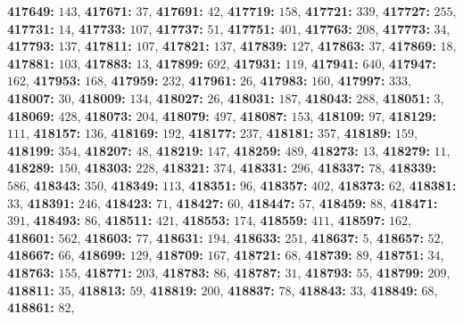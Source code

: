 \textsf{\bfseries 417649:} $143$, \textsf{\bfseries 417671:} $37$, \textsf{\bfseries 417691:} $42$, \textsf{\bfseries 417719:} $158$, \textsf{\bfseries 417721:} $339$, \textsf{\bfseries 417727:} $255$, \textsf{\bfseries 417731:} $14$, \textsf{\bfseries 417733:} $107$, \textsf{\bfseries 417737:} $51$, \textsf{\bfseries 417751:} $401$, \textsf{\bfseries 417763:} $208$, \textsf{\bfseries 417773:} $34$, \textsf{\bfseries 417793:} $137$, \textsf{\bfseries 417811:} $107$, \textsf{\bfseries 417821:} $137$, \textsf{\bfseries 417839:} $127$, \textsf{\bfseries 417863:} $37$, \textsf{\bfseries 417869:} $18$, \textsf{\bfseries 417881:} $103$, \textsf{\bfseries 417883:} $13$, \textsf{\bfseries 417899:} $692$, \textsf{\bfseries 417931:} $119$, \textsf{\bfseries 417941:} $640$, \textsf{\bfseries 417947:} $162$, \textsf{\bfseries 417953:} $168$, \textsf{\bfseries 417959:} $232$, \textsf{\bfseries 417961:} $26$, \textsf{\bfseries 417983:} $160$, \textsf{\bfseries 417997:} $333$, \textsf{\bfseries 418007:} $30$, \textsf{\bfseries 418009:} $134$, \textsf{\bfseries 418027:} $26$, \textsf{\bfseries 418031:} $187$, \textsf{\bfseries 418043:} $288$, \textsf{\bfseries 418051:} $3$, \textsf{\bfseries 418069:} $428$, \textsf{\bfseries 418073:} $204$, \textsf{\bfseries 418079:} $497$, \textsf{\bfseries 418087:} $153$, \textsf{\bfseries 418109:} $97$, \textsf{\bfseries 418129:} $111$, \textsf{\bfseries 418157:} $136$, \textsf{\bfseries 418169:} $192$, \textsf{\bfseries 418177:} $237$, \textsf{\bfseries 418181:} $357$, \textsf{\bfseries 418189:} $159$, \textsf{\bfseries 418199:} $354$, \textsf{\bfseries 418207:} $48$, \textsf{\bfseries 418219:} $147$, \textsf{\bfseries 418259:} $489$, \textsf{\bfseries 418273:} $13$, \textsf{\bfseries 418279:} $11$, \textsf{\bfseries 418289:} $150$, \textsf{\bfseries 418303:} $228$, \textsf{\bfseries 418321:} $374$, \textsf{\bfseries 418331:} $296$, \textsf{\bfseries 418337:} $78$, \textsf{\bfseries 418339:} $586$, \textsf{\bfseries 418343:} $350$, \textsf{\bfseries 418349:} $113$, \textsf{\bfseries 418351:} $96$, \textsf{\bfseries 418357:} $402$, \textsf{\bfseries 418373:} $62$, \textsf{\bfseries 418381:} $33$, \textsf{\bfseries 418391:} $246$, \textsf{\bfseries 418423:} $71$, \textsf{\bfseries 418427:} $60$, \textsf{\bfseries 418447:} $57$, \textsf{\bfseries 418459:} $88$, \textsf{\bfseries 418471:} $391$, \textsf{\bfseries 418493:} $86$, \textsf{\bfseries 418511:} $421$, \textsf{\bfseries 418553:} $174$, \textsf{\bfseries 418559:} $411$, \textsf{\bfseries 418597:} $162$, \textsf{\bfseries 418601:} $562$, \textsf{\bfseries 418603:} $77$, \textsf{\bfseries 418631:} $194$, \textsf{\bfseries 418633:} $251$, \textsf{\bfseries 418637:} $5$, \textsf{\bfseries 418657:} $52$, \textsf{\bfseries 418667:} $66$, \textsf{\bfseries 418699:} $129$, \textsf{\bfseries 418709:} $167$, \textsf{\bfseries 418721:} $68$, \textsf{\bfseries 418739:} $89$, \textsf{\bfseries 418751:} $34$, \textsf{\bfseries 418763:} $155$, \textsf{\bfseries 418771:} $203$, \textsf{\bfseries 418783:} $86$, \textsf{\bfseries 418787:} $31$, \textsf{\bfseries 418793:} $55$, \textsf{\bfseries 418799:} $209$, \textsf{\bfseries 418811:} $35$, \textsf{\bfseries 418813:} $59$, \textsf{\bfseries 418819:} $200$, \textsf{\bfseries 418837:} $78$, \textsf{\bfseries 418843:} $33$, \textsf{\bfseries 418849:} $68$, \textsf{\bfseries 418861:} $82$, 
